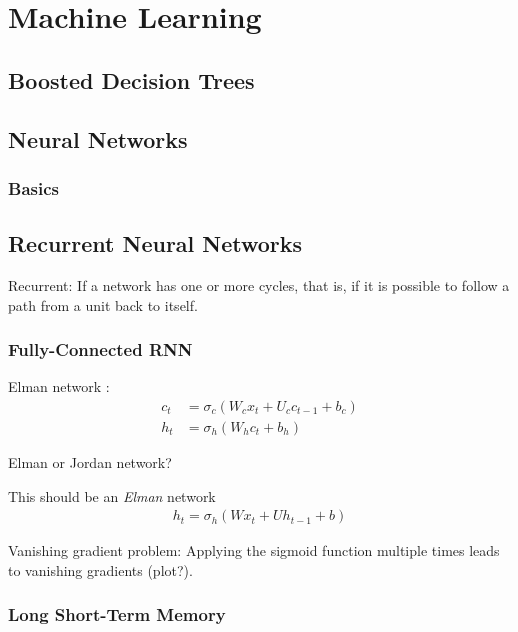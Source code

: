 \chapter{Machine Learning}
\label{sec:ml}

\section{Boosted Decision Trees}
\label{sec:bdt}

\section{Neural Networks}
\label{sec:nn}

\subsection{Basics}
\label{sec:nn_basics}

\section{Recurrent Neural Networks}
\label{sec:rnn}

Recurrent: If a network has one or more cycles, that is, if it is possible to
follow a path from a unit back to itself.

\subsection{Fully-Connected RNN}
\label{sec:fully_connected_rnn}

Elman network \cite{elman}:
\begin{align}
  c_t &= \sigma_c(W_c x_t + U_c c_{t-1} + b_c) \\
  h_t &= \sigma_h(W_h c_t + b_h)
\end{align}

Elman or Jordan network?

This should be an \emph{Elman} network
\begin{align}
  h_t = \sigma_h(W x_t + U h_{t-1} + b)
\end{align}

Vanishing gradient problem: Applying the sigmoid function multiple times leads
to vanishing gradients (plot?).

\subsection{Long Short-Term Memory}
\label{sec:lstm}

